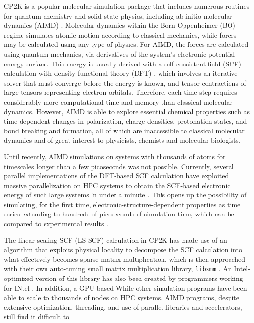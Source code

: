 CP2K \cite{hutter2014cp2k} is a popular molecular simulation package that includes numerous routines for quantum chemistry and solid-state physics, including ab initio molecular dynamics (AIMD) \cite{marx2009ab}. Molecular dynamics within the Born-Oppenheimer (BO) regime simulates atomic motion  according to classical mechanics, while forces may be calculated using any type of physics. For AIMD, the forces are calculated using quantum mechanics, via derivatives of the system's electronic potential energy surface. This energy is usually derived with a self-consistent field (SCF) calculation with density functional theory (DFT) \cite{vandevondele2012linear,hutter2014cp2k}, which involves an iterative solver that must converge before the energy is known, and tensor contractions of large tensors representing electron orbitals. Therefore, each time-step requires considerably more computational time and memory than classical molecular dynamics. However, AIMD is able to explore essential chemical properties such as time-dependent changes in polarization, charge densities, protonation states, and bond breaking and formation, all of which are inaccessible to classical molecular dynamics and of great interest to physicists, chemists and molecular biologists.

Until recently, AIMD simulations on systems with thousands of atoms for timescales longer than a few picoseconds was not possible. Currently, several parallel implementations of the DFT-based SCF calculation have exploited massive parallelization on HPC systems to obtain the SCF-based electronic energy of such large systems in under a minute \cite{vasp_bench,kresse1996efficient,cp2k_bench,vandevondele2012linear}. This opens up the possibility of simulating, for the first time, electronic-structure-dependent properties as time series extending to hundreds of picoseconds of simulation time, which can be compared to experimental results \cite{gillan2016perspective, pestana2017ab, hassanali2013proton, milovanovic2018new, sellner2013charge}.

The linear-scaling SCF (LS-SCF) calculation \cite{vandevondele2012linear} in CP2K has made use of an algorithm that exploits physical locality to decompose the SCF calculation into what effectively becomes sparse matrix multiplication, which is then approached with their own auto-tuning small matrix multiplication library, \texttt{libsmm} \cite{borvstnik2014sparse}. An Intel-optimized version of this library has also been created by programmers working for INtel \cite{heinecke2016libxsmm}. In addition, a GPU-based  While other simulation programs have been able to scale to thousands of nodes on HPC systems, AIMD programs, despite extensive optimization, threading, and use of parallel libraries and accelerators, still find it difficult to 